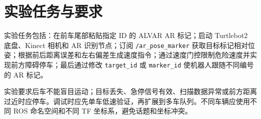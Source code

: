 \section{实验任务与要求}
实验任务包括：在前车尾部粘贴指定 ID 的 ALVAR AR 标记；启动 Turtlebot2 底盘、Kinect 相机和 AR 识别节点；订阅 \texttt{/ar\_pose\_marker} 获取目标标记相对位姿；根据前后距离误差和左右偏差生成速度指令；通过速度门控限制危险速度并实现前方障碍停车；最后通过修改 \texttt{target\_id} 或 \texttt{marker\_id} 使机器人跟随不同编号的 AR 标记。

实验要求后车不能盲目运动；目标丢失、急停信号有效、扫描数据异常或前方距离过近时应停车。调试时应先单车低速验证，再扩展到多车队列。不同车辆应使用不同 ROS 命名空间和不同 TF 坐标系，避免话题和坐标冲突。
